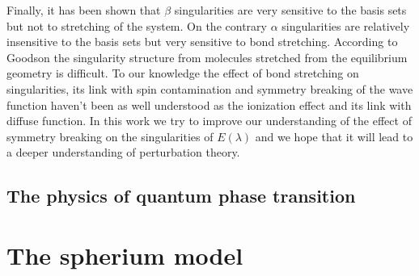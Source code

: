 \documentclass[11pt,a4paper]{article}
\begin{document}
Finally, it has been shown that $\beta$ singularities are very sensitive to the basis sets but not to stretching of the system. On the contrary $\alpha$ singularities are relatively insensitive to the basis sets but very sensitive to bond stretching. According to Goodson the singularity structure from molecules stretched from the equilibrium geometry is difficult. To our knowledge the effect of bond stretching on singularities, its link with spin contamination and symmetry breaking of the wave function haven't been as well understood as the ionization effect and its link with diffuse function. In this work we try to improve our understanding of the effect of symmetry breaking on the singularities of $E(\lambda)$ and we hope that it will lead to a deeper understanding of perturbation theory.

\subsection{The physics of quantum phase transition}

\section{The spherium model}



\newpage



\end{document}
